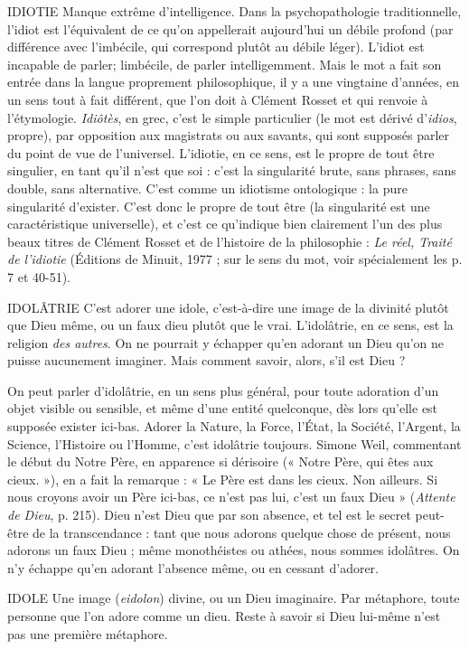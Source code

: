 IDIOTIE Manque extrême d'intelligence. Dans la psychopathologie traditionnelle,
l’idiot est l'équivalent de ce qu’on appellerait aujourd’hui
un débile profond (par différence avec l’imbécile, qui correspond plutôt
au débile léger). L’idiot est incapable de parler; limbécile, de parler
intelligemment. Mais le mot a fait son entrée dans la langue proprement philosophique,
il y a une vingtaine d’années, en un sens tout à fait différent, que l’on
doit à Clément Rosset et qui renvoie à l’étymologie. {\it Idiôtès}, en grec, c’est le
simple particulier (le mot est dérivé d’{\it idios}, propre), par opposition aux magistrats
ou aux savants, qui sont supposés parler du point de vue de l’universel.
L’idiotie, en ce sens, est le propre de tout être singulier, en tant qu’il n’est que
soi : c’est la singularité brute, sans phrases, sans double, sans alternative. C’est
comme un idiotisme ontologique : la pure singularité d’exister. C’est donc le
propre de tout être (la singularité est une caractéristique universelle), et c’est ce
qu’indique bien clairement l’un des plus beaux titres de Clément Rosset et de
l’histoire de la philosophie : {\it Le réel, Traité de l'idiotie} (Éditions de Minuit,
1977 ; sur le sens du mot, voir spécialement les p. 7 et 40-51).

IDOLÂTRIE C’est adorer une idole, c’est-à-dire une image de la divinité
plutôt que Dieu même, ou un faux dieu plutôt que le vrai.
L'idolâtrie, en ce sens, est la religion {\it des autres}. On ne pourrait y échapper
qu’en adorant un Dieu qu’on ne puisse aucunement imaginer. Mais comment
savoir, alors, s’il est Dieu ?

On peut parler d’idolâtrie, en un sens plus général, pour toute adoration
d’un objet visible ou sensible, et même d’une entité quelconque, dès lors qu’elle
est supposée exister ici-bas. Adorer la Nature, la Force, l’État, la Société,
l’Argent, la Science, l'Histoire ou l'Homme, c’est idolâtrie toujours. Simone
Weil, commentant le début du Notre Père, en apparence si dérisoire (« Notre
Père, qui êtes aux cieux. »), en a fait la remarque : « Le Père est dans les cieux.
Non ailleurs. Si nous croyons avoir un Père ici-bas, ce n’est pas lui, c’est un
faux Dieu » ({\it Attente de Dieu}, p. 215). Dieu n’est Dieu que par son absence, et
tel est le secret peut-être de la transcendance : tant que nous adorons quelque
chose de présent, nous adorons un faux Dieu ; même monothéistes ou athées,
nous sommes idolâtres. On n’y échappe qu’en adorant l'absence même, ou en
cessant d’adorer.

IDOLE Une image ({\it eidolon}) divine, ou un Dieu imaginaire. Par métaphore,
toute personne que l’on adore comme un dieu. Reste à
savoir si Dieu lui-même n’est pas une première métaphore.

